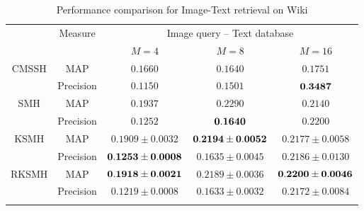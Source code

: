 \begin{table}[htb]\small
\caption{Performance comparison for Image-Text retrieval on \mbox{Wiki}}\label{table:comp-wiki-cross-it}\vspace{-0.5cm}
\begin{center}
\begin{tabular}{|c|c|c|c|c|}
\toprule[1pt]\addlinespace[0pt]
    \multirow{2}{*}{Method}&  \multirow{2}{*}{Measure}  &  \multicolumn{3}{|c|}{Image query -- Text database}  \\
\cline{3-5}%
&&$M=4$&$M=8$&$M=16$\\
\hline
\multirow{2}{*}{CMSSH}&{MAP}    &    $0.1660     $        &  $    0.1640    $ &$ 0.1751$  \\
\cline{2-5}%
&{Precision}    &     	$0.1150   $         &     $   0.1501  $         &        $  {\bf0.3487} $       \\
\hline%
\multirow{2}{*}{SMH}&MAP        &     $0.1937 $         &     $  0.2290    $      &  $ 0.2140$ \\
\cline{2-5}%
&{Precision}    &     	$0.1252   $         &   $ {\bf 0.1640}   $            &    $ 0.2200$         \\
\hline%
\multirow{2}{*}{KSMH}&MAP        &   $0.1909\pm 0.0032$       &  ${\bf0.2194\pm0.0052}$         & $0.2177\pm 0.0058$  \\
\cline{2-5}%
&{Precision}    &  ${\bf0.1253\pm0.0008}$         & $0.1635\pm 0.0045$              &  $0.2186\pm0.0130$\\
\hline%
\multirow{2}{*}{RKSMH}&MAP        &     ${\bf 0.1918\pm0.0021}$         & $0.2189\pm0.0036$          & ${\bf0.2200\pm0.0046}$  \\
\cline{2-5}%
&{Precision}    &    	$0.1219\pm 0.0008        $          &    $0.1633\pm0.0032$           &    $0.2172\pm0.0084$         \\
\addlinespace[0pt]\bottomrule[1pt]
\end{tabular}
\end{center}
\end{table}

